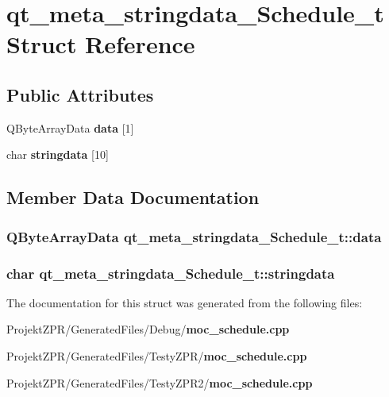 \section{qt\-\_\-meta\-\_\-stringdata\-\_\-\-Schedule\-\_\-t Struct Reference}
\label{structqt__meta__stringdata___schedule__t}
\subsection*{Public Attributes}
\begin{DoxyCompactItemize}
\item 
Q\-Byte\-Array\-Data {\bf data} [1]
\item 
char {\bf stringdata} [10]
\end{DoxyCompactItemize}


\subsection{Member Data Documentation}
\subsubsection[{data}]{\setlength{\rightskip}{0pt plus 5cm}Q\-Byte\-Array\-Data qt\-\_\-meta\-\_\-stringdata\-\_\-\-Schedule\-\_\-t\-::data}\label{structqt__meta__stringdata___schedule__t_a16b0dc70fb28f1a0b5aa5bbf7256a23c}
\subsubsection[{stringdata}]{\setlength{\rightskip}{0pt plus 5cm}char qt\-\_\-meta\-\_\-stringdata\-\_\-\-Schedule\-\_\-t\-::stringdata}\label{structqt__meta__stringdata___schedule__t_a475fb5f203cd226d733a6e128053d176}


The documentation for this struct was generated from the following files\-:\begin{DoxyCompactItemize}
\item 
Projekt\-Z\-P\-R/\-Generated\-Files/\-Debug/{\bf moc\-\_\-schedule.\-cpp}\item 
Projekt\-Z\-P\-R/\-Generated\-Files/\-Testy\-Z\-P\-R/{\bf moc\-\_\-schedule.\-cpp}\item 
Projekt\-Z\-P\-R/\-Generated\-Files/\-Testy\-Z\-P\-R2/{\bf moc\-\_\-schedule.\-cpp}\end{DoxyCompactItemize}
